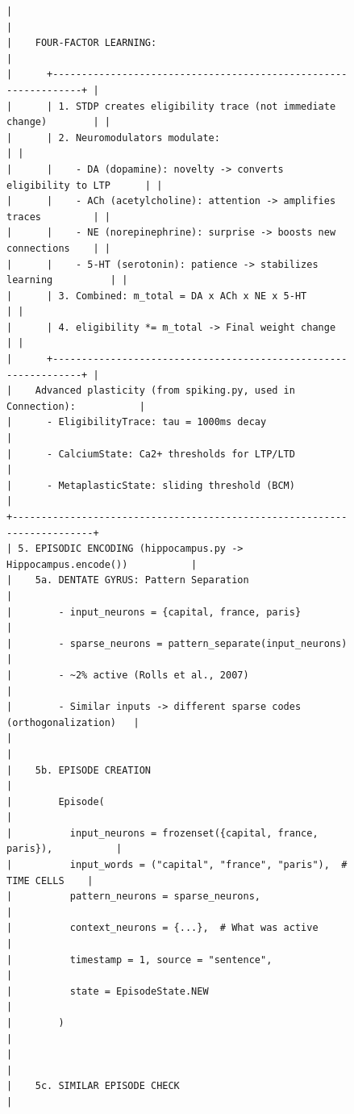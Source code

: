 \documentclass[11pt]{article}
\begin{document}
\begin{figure}[ht]
\begin{Verbatim}[fontsize=\tiny,frame=single]
|                                                                         |
|    FOUR-FACTOR LEARNING:                                                |
|      +----------------------------------------------------------------+ |
|      | 1. STDP creates eligibility trace (not immediate change)        | |
|      | 2. Neuromodulators modulate:                                    | |
|      |    - DA (dopamine): novelty -> converts eligibility to LTP      | |
|      |    - ACh (acetylcholine): attention -> amplifies traces         | |
|      |    - NE (norepinephrine): surprise -> boosts new connections    | |
|      |    - 5-HT (serotonin): patience -> stabilizes learning          | |
|      | 3. Combined: m_total = DA x ACh x NE x 5-HT                     | |
|      | 4. eligibility *= m_total -> Final weight change                | |
|      +----------------------------------------------------------------+ |
|    Advanced plasticity (from spiking.py, used in Connection):           |
|      - EligibilityTrace: tau = 1000ms decay                             |
|      - CalciumState: Ca2+ thresholds for LTP/LTD                        |
|      - MetaplasticState: sliding threshold (BCM)                        |
+-------------------------------------------------------------------------+
| 5. EPISODIC ENCODING (hippocampus.py -> Hippocampus.encode())           |
|    5a. DENTATE GYRUS: Pattern Separation                                |
|        - input_neurons = {capital, france, paris}                       |
|        - sparse_neurons = pattern_separate(input_neurons)               |
|        - ~2% active (Rolls et al., 2007)                                |
|        - Similar inputs -> different sparse codes (orthogonalization)   |
|                                                                         |
|    5b. EPISODE CREATION                                                 |
|        Episode(                                                         |
|          input_neurons = frozenset({capital, france, paris}),           |
|          input_words = ("capital", "france", "paris"),  # TIME CELLS    |
|          pattern_neurons = sparse_neurons,                              |
|          context_neurons = {...},  # What was active                    |
|          timestamp = 1, source = "sentence",                            |
|          state = EpisodeState.NEW                                       |
|        )                                                                |
|                                                                         |
|    5c. SIMILAR EPISODE CHECK                                            |

\end{Verbatim}
\end{figure}
\end{document}

